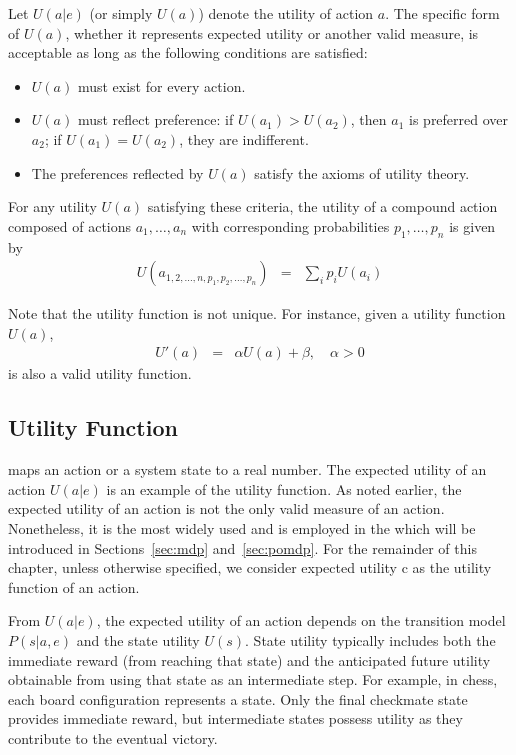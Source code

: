 \begin{mdframed}
	Let $U(a|e)$ (or simply $U(a)$) denote the utility of action $a$. The specific form of $U(a)$, whether it represents expected utility or another valid measure, is acceptable as long as the following conditions are satisfied:
	\begin{itemize}
		\item $U(a)$ must exist for every action.
		\item $U(a)$ must reflect preference: if $U(a_1) > U(a_2)$, then $a_1$ is preferred over $a_2$; if $U(a_1) = U(a_2)$, they are indifferent.
		\item The preferences reflected by $U(a)$ satisfy the axioms of utility theory.
	\end{itemize}
	
	For any utility $U(a)$ satisfying these criteria, the utility of a compound action composed of actions $a_1, \dots, a_n$ with corresponding probabilities $p_1, \dots, p_n$ is given by
	\begin{eqnarray}
		U(a_{1,2,\dots,n,p_1,p_2,\dots,p_n}) &=& \sum_i p_i U(a_i) \nonumber
	\end{eqnarray}
	
	Note that the utility function is not unique. For instance, given a utility function $U(a)$,
	\begin{eqnarray}
		U'(a) &=& \alpha U(a) + \beta, \quad \alpha > 0 \nonumber
	\end{eqnarray}
	is also a valid utility function.
	
\end{mdframed}

\subsection{Utility Function}

 maps an action or a system state to a real number. The expected utility of an action $U(a|e)$ is an example of the utility function. As noted earlier, the expected utility of an action is not the only valid measure of an action. Nonetheless, it is the most widely used and is employed in the  which will be introduced in Sections~\ref{sec:mdp} and~\ref{sec:pomdp}. For the remainder of this chapter, unless otherwise specified, we consider expected utility c as the utility function of an action.

From $U(a|e)$, the expected utility of an action depends on the transition model $P(s|a,e)$ and the state utility $U(s)$. State utility typically includes both the immediate reward (from reaching that state) and the anticipated future utility obtainable from using that state as an intermediate step. For example, in chess, each board configuration represents a state. Only the final checkmate state provides immediate reward, but intermediate states possess utility as they contribute to the eventual victory.

